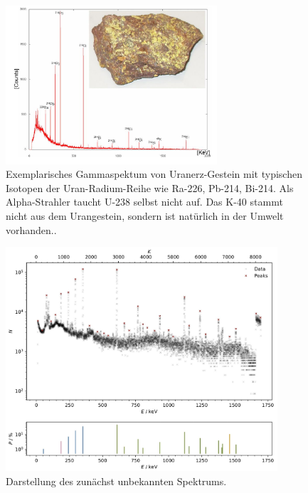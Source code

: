 \begin{figure}[H]
    \centering
    \includegraphics[width=0.7\textwidth]{content/grafik/Gammaspektrum_Uranerz.jpg}
    \caption{Exemplarisches Gammaspektum von Uranerz-Gestein mit typischen Isotopen der Uran-Radium-Reihe
             wie Ra-226, Pb-214, Bi-214. Als Alpha-Strahler taucht U-238 selbst nicht auf. Das K-40 stammt
             nicht aus dem Urangestein, sondern ist natürlich in der Umwelt vorhanden.. \cite{gamma_uran}}
    \label{fig:SpekU}
\end{figure}

\cite{iaea_recom}

\begin{figure}[H]
    \centering
    \includegraphics[width=0.9\textwidth]{content/plots/plot11.jpg}
    \caption{Darstellung des zunächst unbekannten Spektrums.}
    \label{fig:plot11}
\end{figure}

